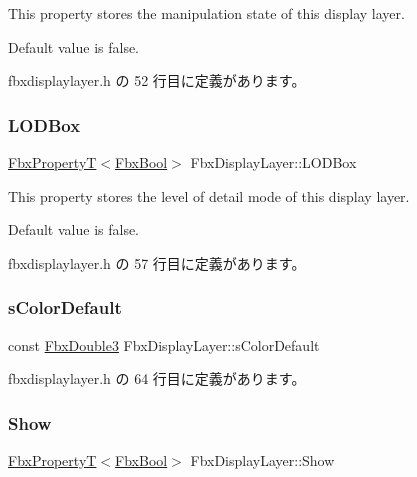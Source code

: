 This property stores the manipulation state of this display layer.

Default value is false. 

 fbxdisplaylayer.\+h の 52 行目に定義があります。

\mbox{\label{class_fbx_display_layer_ae1e076e8613ebc76150369577dbba985}} 
\subsubsection{\texorpdfstring{L\+O\+D\+Box}{LODBox}}
{\footnotesize\ttfamily \hyperlink{class_fbx_property_t}{Fbx\+PropertyT}$<$\hyperlink{fbxtypes_8h_a92e0562b2fe33e76a242f498b362262e}{Fbx\+Bool}$>$ Fbx\+Display\+Layer\+::\+L\+O\+D\+Box}

This property stores the level of detail mode of this display layer.

Default value is false. 

 fbxdisplaylayer.\+h の 57 行目に定義があります。

\mbox{\label{class_fbx_display_layer_a41bcfbb4b645d20daba8da41307fc1a5}} 
\subsubsection{\texorpdfstring{s\+Color\+Default}{sColorDefault}}
{\footnotesize\ttfamily const \hyperlink{fbxtypes_8h_ae0a96f14cde566774c7553aa7523b7a7}{Fbx\+Double3} Fbx\+Display\+Layer\+::s\+Color\+Default\hspace{0.3cm}{\ttfamily [static]}}



 fbxdisplaylayer.\+h の 64 行目に定義があります。

\mbox{\label{class_fbx_display_layer_a06b26abb009bd57c5472c134c3dff9e1}} 
\subsubsection{\texorpdfstring{Show}{Show}}
{\footnotesize\ttfamily \hyperlink{class_fbx_property_t}{Fbx\+PropertyT}$<$\hyperlink{fbxtypes_8h_a92e0562b2fe33e76a242f498b362262e}{Fbx\+Bool}$>$ Fbx\+Display\+Layer\+::\+Show}


